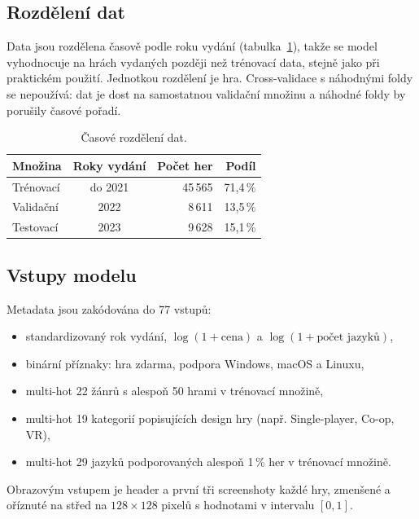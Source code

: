 \subsection*{Rozdělení dat}

Data jsou rozdělena časově podle roku vydání (tabulka~\ref{tab:rozdeleni}), takže se model
vyhodnocuje na hrách vydaných později než trénovací data, stejně jako při praktickém použití.
Jednotkou rozdělení je hra. Cross-validace s náhodnými foldy se nepoužívá: dat je dost
na samostatnou validační množinu a náhodné foldy by porušily časové pořadí.

\begin{table}[h]
    \centering
    \begin{tabular}{lcrr}
        \toprule
        Množina & Roky vydání & Počet her & Podíl \\
        \midrule
        Trénovací & do 2021 & 45\,565 & 71,4\,\% \\
        Validační & 2022 & 8\,611 & 13,5\,\% \\
        Testovací & 2023 & 9\,628 & 15,1\,\% \\
        \bottomrule
    \end{tabular}
    \caption{Časové rozdělení dat.}
    \label{tab:rozdeleni}
\end{table}

\subsection*{Vstupy modelu}

Metadata jsou zakódována do 77 vstupů:
\begin{itemize}
    \item standardizovaný rok vydání, $\log(1 + \text{cena})$ a $\log(1 + \text{počet jazyků})$,
    \item binární příznaky: hra zdarma, podpora Windows, macOS a Linuxu,
    \item multi-hot 22 žánrů s alespoň 50 hrami v trénovací množině,
    \item multi-hot 19 kategorií popisujících design hry (např. Single-player, Co-op, VR),
    \item multi-hot 29 jazyků podporovaných alespoň 1\,\% her v trénovací množině.
\end{itemize}

Obrazovým vstupem je header a první tři screenshoty každé hry, zmenšené a oříznuté na střed
na $128 \times 128$ pixelů s hodnotami v intervalu $[0, 1]$.

